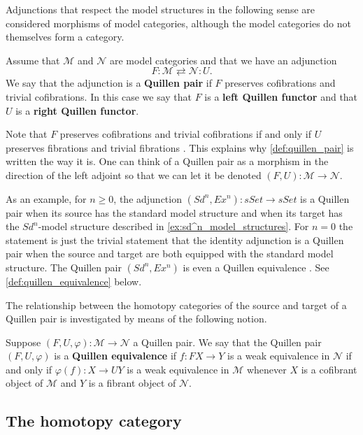 Adjunctions that respect the model structures in the following sense are considered morphisms of model categories, although the model categories do not themselves form a category.
\begin{definition}\label{def:quillen_pair}
Assume that $\mathscr{M}$ and $\mathscr{N}$ are model categories and that we have an adjunction
\[F:\mathscr{M} \rightleftarrows \mathscr{N} :U.\]
We say that the adjunction is a \textbf{Quillen pair} if $F$ preserves cofibrations and trivial cofibrations. In this case we say that $F$ is a \textbf{left Quillen functor} and that $U$ is a \textbf{right Quillen functor}.
\end{definition}
\noindent Note that $F$ preserves cofibrations and trivial cofibrations if and only if $U$ preserves fibrations and trivial fibrations \cite[Prop.~8.5.3, p.~153]{Hi03}. This explains why \cref{def:quillen_pair} is written the way it is. One can think of a Quillen pair as a morphism in the direction of the left adjoint so that we can let it be denoted $(F,U):\mathscr{M} \to \mathscr{N}$.

As an example, for $n\geq 0$, the adjunction $(Sd^n,Ex^n):sSet\to sSet$ is a Quillen pair \cite[Thm.~1.1~(2), p.~274]{Ja13} when its source has the standard model structure and when its target has the $Sd^n$-model structure described in \cref{ex:sd^n_model_structures}. For $n=0$ the statement is just the trivial statement that the identity adjunction is a Quillen pair when the source and target are both equipped with the standard model structure. The Quillen pair $(Sd^n,Ex^n)$ is even a Quillen equivalence \cite[Thm.~1.1~(2), p.~274]{Ja13}. See \cref{def:quillen_equivalence} below.

The relationship between the homotopy categories of the source and target of a Quillen pair is investigated by means of the following notion.
\begin{definition}\label{def:quillen_equivalence}
Suppose $(F,U,\varphi ):\mathscr{M} \to \mathscr{N}$ a Quillen pair. We say that the Quillen pair $(F,U,\varphi )$ is a \textbf{Quillen equivalence} if $f:FX\to Y$ is a weak equivalence in $\mathscr{N}$ if and only if $\varphi (f):X\to UY$ is a weak equivalence in $\mathscr{M}$ whenever $X$ is a cofibrant object of $\mathscr{M}$ and $Y$ is a fibrant object of $\mathscr{N}$.
\end{definition}


\subsection{The homotopy category}

